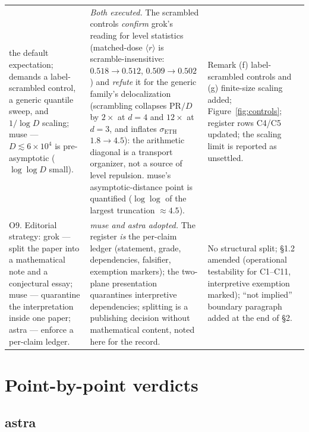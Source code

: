 \documentclass[11pt,a4paper]{article}
\begin{document}
\begin{longtable}{@{}p{}p{}p{}@{}}
the default expectation; demands a label-scrambled control, a generic quantile
sweep, and $1/\log D$ scaling; muse --- $D\lesssim 6\times10^4$ is
pre-asymptotic ($\log\log D$ small). &
\emph{Both executed.} The scrambled controls \emph{confirm} grok's reading for
level statistics (matched-dose $\langle r\rangle$ is scramble-insensitive:
$0.518\to0.512$, $0.509\to0.502$) and \emph{refute} it for the generic family's
delocalization (scrambling collapses PR$/D$ by $2\times$ at $d=4$ and
$12\times$ at $d=3$, and inflates $\sigma_{\mathrm{ETH}}$ $1.8\to4.5$): the
arithmetic diagonal is a transport organizer, not a source of level repulsion.
muse's asymptotic-distance point is quantified ($\log\log$ of the largest
truncation $\approx 4.5$). &
Remark (f) label-scrambled controls and (g) finite-size scaling added;
Figure~\ref{fig:controls}; register rows C4/C5 updated; the scaling limit is
reported as unsettled.\\
O9. Editorial strategy: grok --- split the paper into a mathematical note and
a conjectural essay; muse --- quarantine the interpretation inside one paper;
astra --- enforce a per-claim ledger. &
\emph{muse and astra adopted.} The register \emph{is} the per-claim ledger
(statement, grade, dependencies, falsifier, exemption markers); the two-plane
presentation quarantines interpretive dependencies; splitting is a publishing
decision without mathematical content, noted here for the record. &
No structural split; \S1.2 amended (operational testability for C1--C11,
interpretive exemption marked); ``not implied'' boundary paragraph added at the
end of \S2.\\
\bottomrule
\end{longtable}

\section{Point-by-point verdicts}

\subsection{astra}
\end{document}
